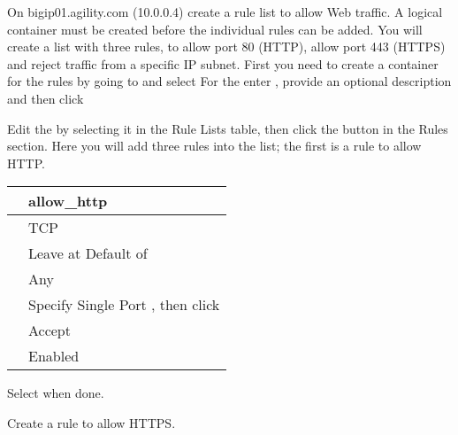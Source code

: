 \documentclass[letterpaper,10pt,english]{sphinxmanual}
\begin{document}
On bigip01.agility.com (10.0.0.4) create a rule list to allow Web
traffic. A logical container must be created before the individual rules
can be added. You will create a list with three rules, to allow port 80
(HTTP), allow port 443 (HTTPS) and reject traffic from a specific IP
subnet. First you need to create a container for the rules by going to
 and select 
For the  enter , provide an optional
description and then click 


Edit the  by selecting it in the Rule Lists table,
then click the  button in the Rules section. Here you will add
three rules into the list; the first is a rule to allow HTTP.



\begin{savenotes}\sphinxattablestart
\centering
\begin{tabulary}{\linewidth}[t]{|T|T|}
\hline

&
allow\_http
\\
\hline
{}
&
TCP
\\
\hline
{}
&
Leave at Default of 
\\
\hline
{}
&
Any
\\
\hline
{}
&
Specify Single Port , then click 
\\
\hline
{}
&
Accept
\\
\hline
{}
&
Enabled
\\
\hline
\end{tabulary}
\par
\sphinxattableend\end{savenotes}


Select  when done.

Create a rule to allow HTTPS.
\end{document}
